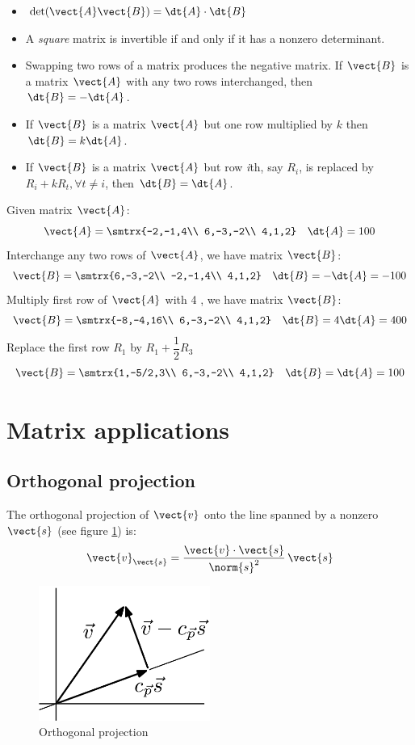\begin{itemize}
\item $\det (\vect{A}\vect{B})=\dt{A} \cdot \dt{B}$
\item A \emph{square} matrix is invertible if and only if it has a nonzero determinant.
\item Swapping two rows of a matrix produces the negative matrix. If $\vect{B}$ is a matrix $\vect{A}$ with any two rows interchanged, then $\dt{B}=-\dt{A}$.
\item If $\vect{B}$ is a matrix $\vect{A}$ but one row multiplied by $k$ then $\dt{B}=k\dt{A}$.
\item If $\vect{B}$ is a matrix $\vect{A}$ but row \emph{i}th, say $R_i$, is replaced by $R_i + kR_t, \forall t \neq i$, then $\dt{B}=\dt{A}$.
\end{itemize}
\begin{example}
Given matrix $\vect{A}$:
\[ \vect{A}=\smtrx{-2,-1,4\\ 6,-3,-2\\ 4,1,2} \quad \dt{A}=100 \]
Interchange any two rows of $\vect{A}$, we have matrix $\vect{B}$:
\[ \vect{B}=\smtrx{6,-3,-2\\ -2,-1,4\\ 4,1,2} \quad \dt{B}=-\dt{A}=-100 \]
Multiply first row of $\vect{A}$ with 4 , we have matrix $\vect{B}$:
\[ \vect{B}=\smtrx{-8,-4,16\\ 6,-3,-2\\ 4,1,2} \quad \dt{B}=4\dt{A}=400 \]
Replace the first row $R_1$ by $R_1+\dfrac{1}{2}R_3$
\[ \vect{B}=\smtrx{1,-5/2,3\\ 6,-3,-2\\ 4,1,2} \quad \dt{B}=\dt{A}=100 \]
\end{example}
\section{Matrix applications}
\subsection{Orthogonal projection}
The orthogonal projection of $\vect{v}$ onto the line spanned by a nonzero $\vect{s}$ (see figure \ref{Linalg_projection}) is: 
\[ \vect{v}_{\vect{s}}=\frac{\vect{v}\cdot\vect{s}}{\norm{s}^2} \, \vect{s} \]
\begin{figure}[hbtp]
\caption{Orthogonal projection}
\label{Linalg_projection}
\centering
\includegraphics[width=0.5\textwidth]{Linalg_projection_4.png}
\end{figure}
